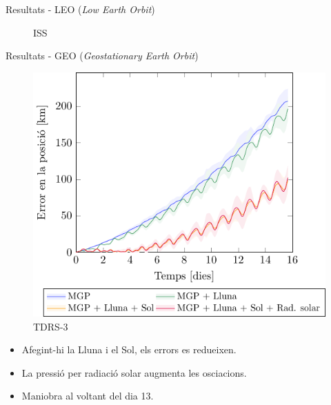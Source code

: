 \documentclass{beamer} %
\begin{document}
\begin{frame}{Resultats - LEO (\emph{Low Earth Orbit})}
\begin{figure}[htbp]
\begin{minipage}[ht]{0.45\textwidth}
      \caption{\hspace{0.8cm}ISS}
    \end{minipage}
  \end{figure}
\end{frame}
\begin{frame}{Resultats - GEO (\emph{Geostationary Earth Orbit})}
  \begin{minipage}{0.48\textwidth}
    \begin{figure}[ht]
      \centering
      \includegraphics[width=\textwidth]{../Images/simulation/TDRS-3_ca.pdf}
      \caption{TDRS-3}
    \end{figure}
  \end{minipage}
  \hfill
  \begin{minipage}{0.48\textwidth}
    \begin{itemize}
      \item Afegint-hi la Lluna i el Sol, els errors es redueixen.
      \item La pressió per radiació solar augmenta les osci\lgem acions.
      \item Maniobra al voltant del dia 13.
    \end{itemize}
  \end{minipage}
\end{frame}
\end{document}
